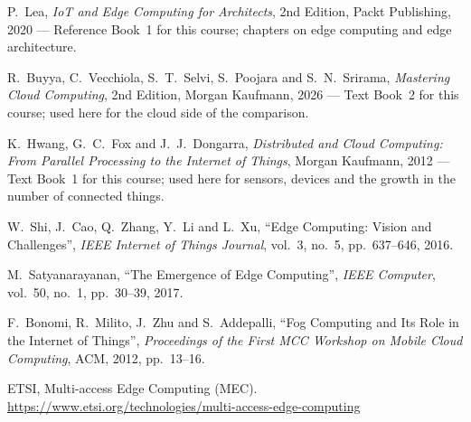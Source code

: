 \documentclass[../main.tex]{subfiles}
\begin{document}
\begin{enumerate}[label={[\arabic*]},ref=\arabic*,leftmargin=2.2em]
  \item\label{ref:lea} P.~Lea, \textit{IoT and Edge Computing for
        Architects}, 2nd Edition, Packt Publishing, 2020 --- Reference
        Book~1 for this course; chapters on edge computing and edge
        architecture.
  \item\label{ref:buyyacloud} R.~Buyya, C.~Vecchiola, S.~T.~Selvi,
        S.~Poojara and S.~N.~Srirama, \textit{Mastering Cloud Computing}, 2nd
        Edition, Morgan Kaufmann, 2026 --- Text Book~2 for this course; used
        here for the cloud side of the comparison.
  \item\label{ref:hwangiot} K.~Hwang, G.~C.~Fox and J.~J.~Dongarra,
        \textit{Distributed and Cloud Computing: From Parallel Processing to
        the Internet of Things}, Morgan Kaufmann, 2012 --- Text Book~1 for
        this course; used here for sensors, devices and the growth in the
        number of connected things.
  \item\label{ref:shi} W.~Shi, J.~Cao, Q.~Zhang, Y.~Li and L.~Xu, ``Edge
        Computing: Vision and Challenges'', \textit{IEEE Internet of Things
        Journal}, vol.~3, no.~5, pp.~637--646, 2016.
  \item\label{ref:satya} M.~Satyanarayanan, ``The Emergence of Edge
        Computing'', \textit{IEEE Computer}, vol.~50, no.~1, pp.~30--39,
        2017.
  \item\label{ref:bonomi} F.~Bonomi, R.~Milito, J.~Zhu and S.~Addepalli,
        ``Fog Computing and Its Role in the Internet of Things'',
        \textit{Proceedings of the First MCC Workshop on Mobile Cloud
        Computing}, ACM, 2012, pp.~13--16.
  \item\label{ref:etsi} ETSI, Multi-access Edge Computing (MEC).
        \url{https://www.etsi.org/technologies/multi-access-edge-computing}
\end{enumerate}
\end{document}
